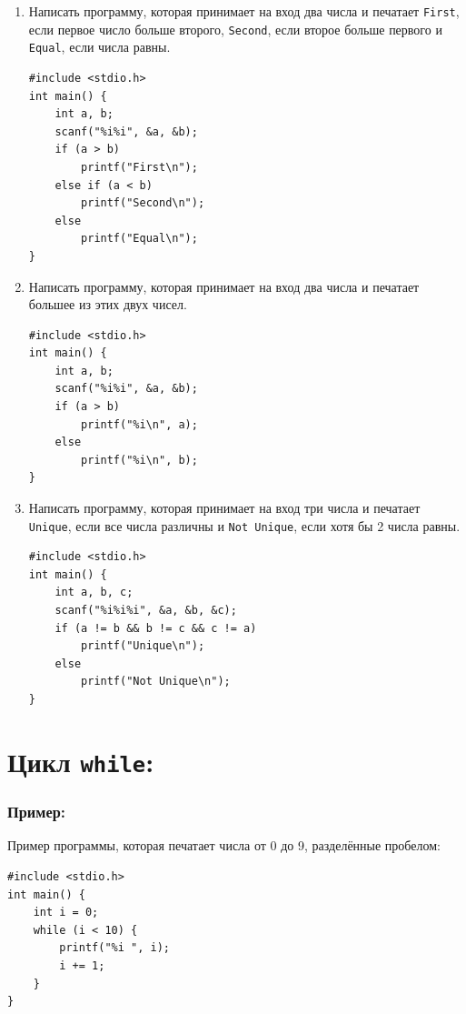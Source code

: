 \documentclass{article}
\begin{document}
\begin{enumerate}
\newpage
\item Написать программу, которая принимает на вход два числа и печатает \texttt{First}, если первое число больше второго, \texttt{Second}, если второе больше первого и \texttt{Equal}, если числа равны.
\begin{lstlisting}[backgroundcolor = \color{solcolor}]
#include <stdio.h>
int main() {
	int a, b;
	scanf("%i%i", &a, &b);
	if (a > b)
		printf("First\n");
	else if (a < b)
		printf("Second\n");
	else
		printf("Equal\n");
}
\end{lstlisting}
\item Написать программу, которая принимает на вход два числа и печатает большее из этих двух чисел.
\begin{lstlisting}[backgroundcolor = \color{solcolor}]
#include <stdio.h>
int main() {
	int a, b;
	scanf("%i%i", &a, &b);
	if (a > b)
		printf("%i\n", a);
	else
		printf("%i\n", b);
}
\end{lstlisting}
\item Написать программу, которая принимает на вход три числа и печатает \texttt{Unique}, если все числа различны и \texttt{Not Unique}, если хотя бы 2 числа равны.
\begin{lstlisting}[backgroundcolor = \color{solcolor}]
#include <stdio.h>
int main() {
	int a, b, c;
	scanf("%i%i%i", &a, &b, &c);
	if (a != b && b != c && c != a)
		printf("Unique\n");
	else
		printf("Not Unique\n");
}
\end{lstlisting}
\end{enumerate}

\newpage
\section*{Цикл \texttt{while}:}
\subsubsection*{Пример:}
Пример программы, которая печатает числа от 0 до 9, разделённые пробелом:
\begin{lstlisting}
#include <stdio.h>
int main() {
    int i = 0;
    while (i < 10) {
        printf("%i ", i);
        i += 1;
    }
}
\end{lstlisting}
\end{document}

